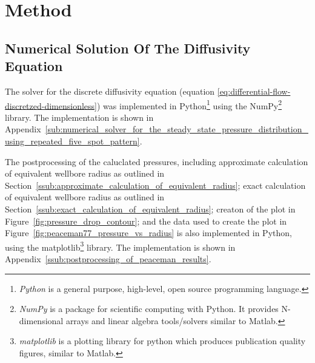 
\section{Method} %
\label{sec:method}

\subsection{Numerical Solution Of The Diffusivity Equation} %
\label{sub:numerical_solution_of_the_diffusivity_equation}
The solver for the discrete diffusivity equation (equation \eqref{eq:differential-flow-discretzed-dimensionless}) was implemented in Python\footnote{\emph{Python} is a general purpose, high-level, open source programming language.} using the NumPy\footnote{\emph{NumPy} is a package for scientific computing with Python. It provides N-dimensional arrays and linear algebra tools/solvers similar to Matlab.} library. The implementation is shown in Appendix~\ref{sub:numerical_solver_for_the_steady_state_pressure_distribution_using_repeated_five_spot_pattern}.

The postprocessing of the caluclated pressures, including approximate calculation of equivalent wellbore radius as outlined in Section~\ref{ssub:approximate_calculation_of_equivalent_radius}; exact calculation of equivalent wellbore radius as outlined in Section~\ref{ssub:exact_calculation_of_equivalent_radius}; creaton of the plot in Figure~\ref{fig:pressure_drop_contour}; and the data used to create the plot in Figure~\ref{fig:peaceman77_pressure_vs_radius} is also implemented in Python, using the matplotlib\footnote{\emph{matplotlib} is a plotting library for python which produces publication quality figures, similar to Matlab.} library. The implementation is shown in Appendix~\ref{ssub:postprocessing_of_peaceman_results}.

